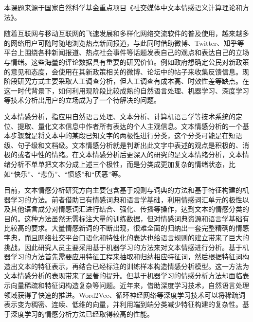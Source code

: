 


本课题来源于国家自然科学基金重点项目《社交媒体中文本情感语义计算理论和方法》。


随着互联网与移动互联网的飞速发展和多样化网络交流软件的普及使用，越来越多的网络用户可随时随地浏览热点新闻报道，与此同时借助微博、Twitter、知乎等平台上围绕各种新闻报道、热点社会事件等话题发表自己的观点和表达自己的立场与情绪。这些海量的评论数据具有重要的研究价值。例如政府想确定公民对新政策的意见和态度，会使用在其新政策相关的微博、论坛中的帖子来收集反馈信息。现阶段研究方式主要采取人工调查分析，但人工调查有成本高、时效性差等缺点。在这一时代背景下，如何利用现阶段比较成熟的自然语言处理、机器学习、深度学习等技术分析出用户的立场成为了一个待解决的问题。

文本情感分析，指应用自然语言处理、文本分析、计算机语言学等技术系统的定位、提取、量化文本信息中作者所有表达的个人主观信息。文本情感分析的一个基本步骤就是将文本中的某段已知文字的两极性进行分类，这个分类可能是在短语级、句子级和文档级。文本情感分析就是判断出此文字中表述的观点是积极的、消极的或者中性的情绪。在文本情感分析后更深入的研究的是文本情绪分析，文本情绪分析不单单把文本分成上述三个极性，而是分类成更加复杂的情绪状态，比如“快乐”、“悲伤”、“愤怒”和“厌恶”等。

目前，文本情感分析研究方向主要包含基于规则与词典的方法和基于特征构建的机器学习的方法。前者借助已有情感词典和语言学基础，利用情感词汇单元的极性以及其他语言成分对情感词汇进行结合、强化、传播等操作，达到文本的情感分类的目的。这种方法虽然无需标注大量的训练数据，但对情感词典资源和语言学基础有比较高的要求。大量情感新词的不断出现，很难全面的归纳出一套完整精确的情感字典，而且网络社交平台口语化和特性化的表达也给语言规则的建立带来了巨大的挑战，因此研究人员主要采用基于机器学习的方法来对文本情感进行分析。基于机器学习的方法首先需要应用特征工程来抽取和归纳相应特征词，然后根据特征词构造出文本的特征表示，再结合已经标注的训练样本构造情感分析模型。这一方法为文本情感分析的表现带来了显著的提升。但基于机器学习的情感分析方法却面临表示向量稀疏和特征词构造复杂等问题。近年来，借助深度学习技术，自然语言处理领域获得了快速的推进。Word2Vec、循环神经网络等深度学习技术可以将稀疏词表示变为稠密、连续、低维的向量，并利用端到端分类减少特征构建的复杂性。基于深度学习的情感分析方法已经取得较高的性能。

